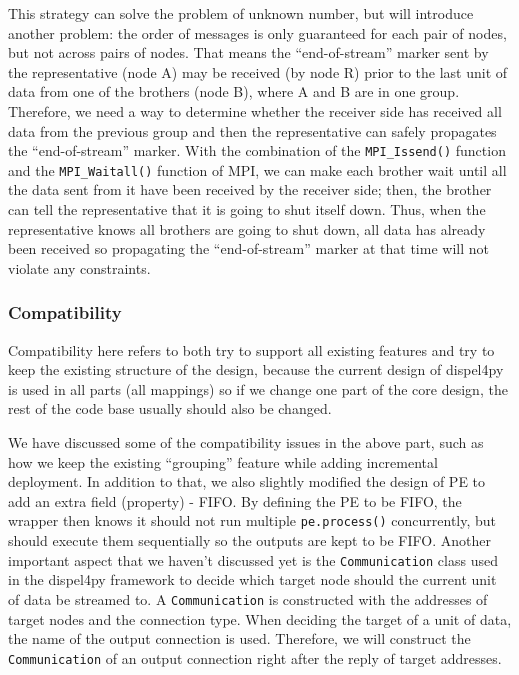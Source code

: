 \documentclass[•]{article}
\begin{document}
	This strategy can solve the problem of unknown number, but will introduce another problem: the order of messages is only guaranteed for each pair of nodes, but not across pairs of nodes. That means the ``end-of-stream'' marker sent by the representative (node A) may be received (by node R) prior to the last unit of data from one of the brothers (node B), where A and B are in one group.
	 Therefore, we need a way to determine whether the receiver side has received all data from the previous group and then the representative can safely propagates the ``end-of-stream'' marker. With the combination of the 
\lstinline|MPI_Issend()| function and the \lstinline|MPI_Waitall()| function of MPI, we can make each brother wait until all the data sent from it have been received by the receiver side; then, the brother can tell the representative that it is going to shut itself down. Thus, when the representative knows all brothers are going to shut down, all data has already been received so propagating the ``end-of-stream'' marker at that time will not violate any constraints.
	
	\subsubsection{Compatibility}
	Compatibility here refers to both try to support all existing features and try to keep the existing structure of the design, because the current design of dispel4py is used in all parts (all mappings) so if we change one part of the core design, the rest of the code base usually should also be changed.
	
	We have discussed some of the compatibility issues in the above part, such as how we keep the existing ``grouping'' feature while adding incremental deployment. In addition to that, we also slightly modified the design of PE to add an extra field (property) - FIFO. By defining the PE to be FIFO, the wrapper then knows it should not run multiple \lstinline|pe.process()| concurrently, but should execute them sequentially so the outputs are kept to be FIFO. Another important aspect that we haven't discussed yet is the \lstinline|Communication| class used in the dispel4py framework to decide which  target node should the current unit of data be streamed to. A \lstinline|Communication| is constructed with the addresses of target nodes and the connection type. When deciding the target of a unit of data, the name of the output connection is used. Therefore, we will construct the \lstinline|Communication| of an output connection right after the reply of target addresses.
	
\end{document}
